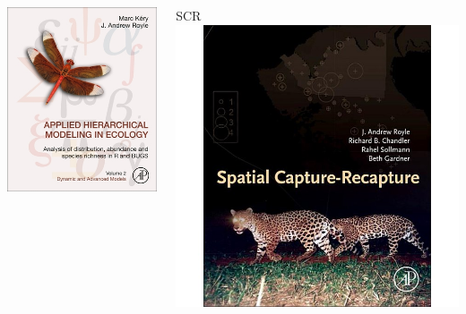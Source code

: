 \documentclass[color=usenames,dvipsnames]{beamer}\usepackage[]{graphicx}\usepackage[]{color}
\begin{document}
\begin{frame}
\begin{columns}
\begin{column}{0.33\textwidth}
      \includegraphics[width=\textwidth]{figs/KeryRoyleBookCoverV2} \\
    \end{column}
    \begin{column}{0.33\textwidth}
      \centering
      SCR \\
      \includegraphics[width=\textwidth,trim=21mm 0mm 21mm 0mm,clip]{figs/SCRcover} \\

\end{column}
\end{columns}
\end{frame}
\end{document}
